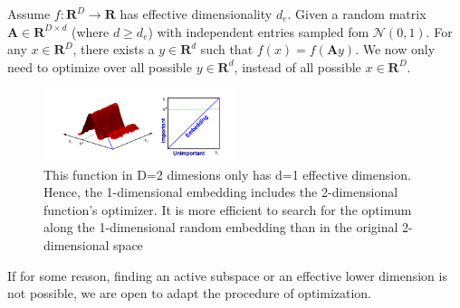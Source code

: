 \begin{enumerate}
Assume $ f : \mathbf{R}^D \rightarrow \mathbf{R} $ has effective dimensionality $d_e$.
Given a random matrix $ \mathbf{A} \in \mathbf{R}^{D \times d} $ (where $d \geq d_e$) with independent entries sampled fom $ \mathcal{N}(0, 1) $.
For any $ x \in \mathbf{R}^D $, there exists a $y \in \mathbf{R}^d $ such that $ f(x) = f(\mathbf{A} y ) $.
We now only need to optimize over all possible $y \in \mathbf{R}^d$, instead of all possible $x \in \mathbf{R}^D $.


\begin{figure}[h]
\centering
\includegraphics[width=0.5\textwidth]{./../src/Embedding_optimization.png}
\caption{ This function in D=2 dimesions only has d=1 effective dimension. Hence, the 1-dimensional embedding includes the 2-dimensional function’s optimizer. It is more efficient to search for the optimum along the 1-dimensional random embedding than in the original 2-dimensional space}
\end{figure}

\end{enumerate}

If for some reason, finding an active subspace or an effective lower dimension is not possible, we are open to adapt the procedure of optimization.

